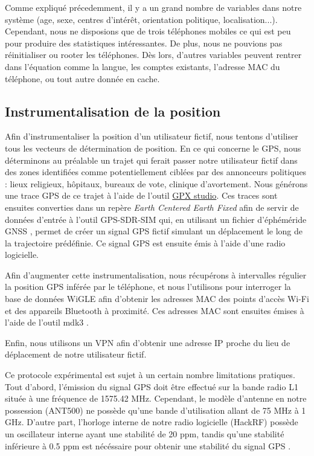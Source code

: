 \documentclass[runningheads]{llncs}
\begin{document}
Comme expliqué précedemment, il y a un grand nombre de variables dans notre système (age, sexe, centres d'intérêt, orientation politique, localisation...). Cependant, nous ne disposions que de trois téléphones mobiles ce qui est peu pour produire des statistiques intéressantes. De plus, nous ne pouvions pas réinitialiser ou rooter les téléphones. Dès lors, d'autres variables peuvent rentrer dans l'équation comme la langue, les comptes existants, l'adresse MAC du téléphone, ou tout autre donnée en cache.

\subsection{Instrumentalisation de la position}

Afin d'instrumentaliser la position d'un utilisateur fictif, nous tentons d'utiliser tous les vecteurs de détermination de position. 
En ce qui concerne le GPS, nous déterminons au préalable un trajet qui ferait passer notre utilisateur fictif dans des zones identifiées comme potentiellement ciblées par des annonceurs politiques : lieux religieux, hôpitaux, bureaux de vote, clinique d'avortement. Nous générons une trace GPS de ce trajet à l'aide de l'outil \href{https://gpxstudio.github.io/}{GPX studio}. Ces traces sont ensuites converties dans un repère \textit{Earth Centered Earth Fixed} afin de servir de données d'entrée à l'outil GPS-SDR-SIM \cite{osqzss_osqzssgps-sdr-sim_2020} qui, en utilisant un fichier d'éphéméride GNSS \cite{national_aeronautics_and_space_administration_gnss_2020}, permet de créer un signal GPS fictif simulant un déplacement le long de la trajectoire prédéfinie. Ce signal GPS est ensuite émis à l'aide d'une radio logicielle.

Afin d'augmenter cette instrumentalisation, nous récupérons à intervalles régulier la position GPS inférée par le téléphone, et nous l'utilisons pour interroger la base de données WiGLE afin d'obtenir les adresses MAC des points d'accès Wi-Fi et des appareils Bluetooth à proximité. Ces adresses MAC sont ensuites émises à l'aide de l'outil mdk3 \cite{aspj_mdk3_2013}.

Enfin, nous utilisons un VPN afin d'obtenir une adresse IP proche du lieu de déplacement de notre utilisateur fictif.

Ce protocole expérimental est sujet à un certain nombre limitations pratiques. 
Tout d'abord, l'émission du signal GPS doit être effectué sur la bande radio L1 située à une fréquence de 1575.42 MHz. Cependant, le modèle d'antenne en notre possession (ANT500) ne possède qu'une bande d'utilisation allant de 75 MHz à 1 GHz. D'autre part, l'horloge interne de notre radio logicielle (HackRF) possède un oscillateur interne ayant une stabilité de 20 ppm, tandis qu'une stabilité inférieure à 0.5 ppm est nécéssaire pour obtenir une stabilité du signal GPS \cite{kao_miniature_2014}.
\end{document}
